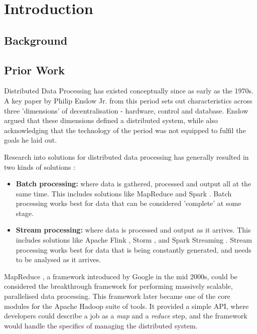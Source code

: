 \chapter{Introduction}


\section{Background}


\section{Prior Work}

Distributed Data Processing has existed conceptually since as early as the 1970s. A key paper by Philip Enslow Jr. from this period \cite{enslow1978distributed} sets out characteristics across three 'dimensions' of decentralisation - hardware, control and database. Enslow argued that these dimensions defined a distributed system, while also acknowledging that the technology of the period was not equipped to fulfil the goals he laid out.

Research into solutions for distributed data processing has generally resulted in two kinds of solutions \cite{yaqoob2016big}:
\begin{itemize}
	\item \textbf{Batch processing:} where data is gathered, processed and output all at the same time. This includes solutions like MapReduce \cite{dean2008mapreduce} and Spark \cite{zaharia2016spark}. Batch processing works best for data that can be considered 'complete' at some stage.
	\item \textbf{Stream processing:} where data is processed and output as it arrives. This includes solutions like Apache Flink \cite{carbone2015flink}, Storm \cite{toshniwal2014storm}, and Spark Streaming \cite{armbrust2018sparkstreaming}. Stream processing works best for data that is being constantly generated, and needs to be analysed as it arrives.
\end{itemize}

MapReduce \cite{dean2008mapreduce}, a framework introduced by Google  in the mid 2000s, could be considered the breakthrough framework for performing massively scalable, parallelised data processing. This framework later became one of the core modules for the Apache Hadoop suite of tools. It provided a simple API, where developers could describe a job as a \textit{map} and a \textit{reduce} step, and the framework would handle the specifics of managing the distributed system. 

